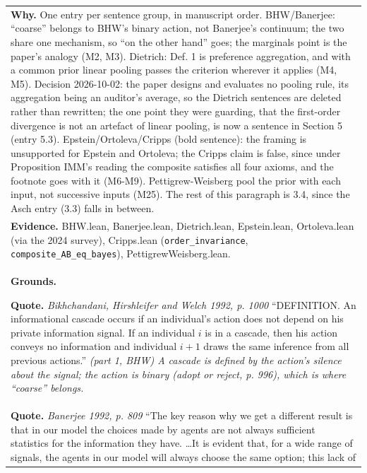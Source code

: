 \documentclass[10pt]{article}
\theoremstyle{definition}
\newlength{\fullw}\setlength{\fullw}{25.9cm}
\begin{document}
{\begin{longtable}{|p{0.9cm}|p{12.2cm}|p{12.2cm}|}
\multicolumn{3}{|p{\fullw}|}{\textbf{Why.} One entry per sentence group, in manuscript order. BHW/Banerjee: ``coarse'' belongs to BHW's binary action, not Banerjee's continuum; the two share one mechanism, so ``on the other hand'' goes; the marginals point is the paper's analogy (M2, M3). Dietrich: Def. 1 is preference aggregation, and with a common prior linear pooling passes the criterion wherever it applies (M4, M5). Decision 2026-10-02: the paper designs and evaluates no pooling rule, its aggregation being an auditor's average, so the Dietrich sentences are deleted rather than rewritten; the one point they were guarding, that the first-order divergence is not an artefact of linear pooling, is now a sentence in Section 5 (entry 5.3). Epstein/Ortoleva/Cripps (bold sentence): the framing is unsupported for Epstein and Ortoleva; the Cripps claim is false, since under Proposition IMM's reading the composite satisfies all four axioms, and the footnote goes with it (M6-M9). Pettigrew-Weisberg pool the prior with each input, not successive inputs (M25). The rest of this paragraph is 3.4, since the Asch entry (3.3) falls in between.} \\
\multicolumn{3}{|p{\fullw}|}{\textbf{Evidence.} BHW.lean, Banerjee.lean, Dietrich.lean, Epstein.lean, Ortoleva.lean (via the 2024 survey), Cripps.lean (\texttt{order\_invariance}, \texttt{composite\_AB\_eq\_bayes}), PettigrewWeisberg.lean.} \\ \hline
\multicolumn{3}{|p{\fullw}|}{\textbf{Grounds.}\par \textbf{Quote.} \textit{Bikhchandani, Hirshleifer and Welch 1992, p. 1000} \newline ``DEFINITION. An informational cascade occurs if an individual's
action does not depend on his private information signal. If an individual $i$
is in a cascade, then his action conveys no information and individual $i+1$
draws the same inference from all previous actions.'' \newline \textit{(part 1, BHW) A cascade is defined by the action's silence about
the signal; the action is binary (adopt or reject, p. 996), which is where
``coarse'' belongs.}} \\
\multicolumn{3}{|p{\fullw}|}{\textbf{Quote.} \textit{Banerjee 1992, p. 809} \newline ``The key reason why we get a different result is that in our
model the choices made by agents are not always sufficient statistics for the
information they have. \ldots It is evident that, for a wide range of signals,
the agents in our model will always choose the same option; this lack of
}
\end{longtable}}
\end{document}
